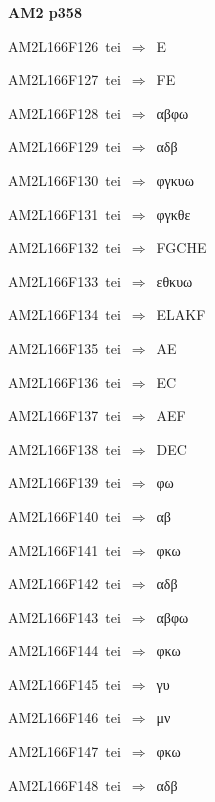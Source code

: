 \par\vfill\eject
{\bf\hfill AM2 p358\hfill\hbox{}}\par\bigskip
{\sixrm AM2L166F126\ {\sixit tei}\ }$\Rightarrow$\ E\par\smallskip
{\sixrm AM2L166F127\ {\sixit tei}\ }$\Rightarrow$\ FE\par\smallskip
{\sixrm AM2L166F128\ {\sixit tei}\ }$\Rightarrow$\ αβφω\par\smallskip
{\sixrm AM2L166F129\ {\sixit tei}\ }$\Rightarrow$\ αδβ\par\smallskip
{\sixrm AM2L166F130\ {\sixit tei}\ }$\Rightarrow$\ φγκυω\par\smallskip
{\sixrm AM2L166F131\ {\sixit tei}\ }$\Rightarrow$\ φγκθε\par\smallskip
{\sixrm AM2L166F132\ {\sixit tei}\ }$\Rightarrow$\ FGCHE\par\smallskip
{\sixrm AM2L166F133\ {\sixit tei}\ }$\Rightarrow$\ εθκυω\par\smallskip
{\sixrm AM2L166F134\ {\sixit tei}\ }$\Rightarrow$\ ELAKF\par\smallskip
{\sixrm AM2L166F135\ {\sixit tei}\ }$\Rightarrow$\ AE\par\smallskip
{\sixrm AM2L166F136\ {\sixit tei}\ }$\Rightarrow$\ EC\par\smallskip
{\sixrm AM2L166F137\ {\sixit tei}\ }$\Rightarrow$\ AEF\par\smallskip
{\sixrm AM2L166F138\ {\sixit tei}\ }$\Rightarrow$\ DEC\par\smallskip
{\sixrm AM2L166F139\ {\sixit tei}\ }$\Rightarrow$\ φω\par\smallskip
{\sixrm AM2L166F140\ {\sixit tei}\ }$\Rightarrow$\ αβ\par\smallskip
{\sixrm AM2L166F141\ {\sixit tei}\ }$\Rightarrow$\ φκω\par\smallskip
{\sixrm AM2L166F142\ {\sixit tei}\ }$\Rightarrow$\ αδβ\par\smallskip
{\sixrm AM2L166F143\ {\sixit tei}\ }$\Rightarrow$\ αβφω\par\smallskip
{\sixrm AM2L166F144\ {\sixit tei}\ }$\Rightarrow$\ φκω\par\smallskip
{\sixrm AM2L166F145\ {\sixit tei}\ }$\Rightarrow$\ γυ\par\smallskip
{\sixrm AM2L166F146\ {\sixit tei}\ }$\Rightarrow$\ μν\par\smallskip
{\sixrm AM2L166F147\ {\sixit tei}\ }$\Rightarrow$\ φκω\par\smallskip
{\sixrm AM2L166F148\ {\sixit tei}\ }$\Rightarrow$\ αδβ\par\smallskip
